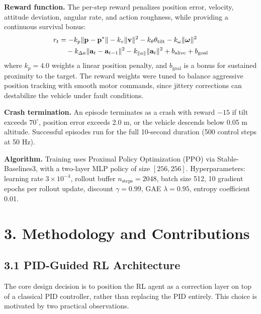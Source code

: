 \documentclass[12pt,letterpaper]{article}
\begin{document}
\textbf{Reward function.} The per-step reward penalizes position error, velocity, attitude deviation, angular rate, and action roughness, while providing a continuous survival bonus:
\begin{align}
    r_t &= -k_p \|\mathbf{p} - \mathbf{p}^*\|
         - k_v \|\mathbf{v}\|^2
         - k_\theta \theta_{\text{tilt}}
         - k_\omega \|\boldsymbol{\omega}\|^2 \notag \\
        &\quad - k_{\Delta a} \|\mathbf{a}_t - \mathbf{a}_{t-1}\|^2
         - k_{\|a\|} \|\mathbf{a}_t\|^2
         + b_{\text{alive}}
         + b_{\text{goal}}
\end{align}
where $k_p = 4.0$ weights a linear position penalty, and $b_{\text{goal}}$ is a bonus for sustained proximity to the target. The reward weights were tuned to balance aggressive position tracking with smooth motor commands, since jittery corrections can destabilize the vehicle under fault conditions.

\textbf{Crash termination.} An episode terminates as a crash with reward $-15$ if tilt exceeds $70^\circ$, position error exceeds 2.0 m, or the vehicle descends below 0.05 m altitude. Successful episodes run for the full 10-second duration (500 control steps at 50 Hz).

\textbf{Algorithm.} Training uses Proximal Policy Optimization (PPO) via Stable-Baselines3, with a two-layer MLP policy of size $[256, 256]$. Hyperparameters: learning rate $3 \times 10^{-4}$, rollout buffer $n_{\text{steps}} = 2048$, batch size 512, 10 gradient epochs per rollout update, discount $\gamma = 0.99$, GAE $\lambda = 0.95$, entropy coefficient 0.01.

\section*{3. Methodology and Contributions}

\subsection*{3.1 PID-Guided RL Architecture}

The core design decision is to position the RL agent as a correction layer on top of a classical PID controller, rather than replacing the PID entirely. This choice is motivated by two practical observations.
\end{document}
